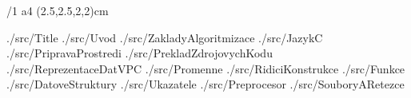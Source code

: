 

\cslang
\typosize[12/16]
\margins/1 a4 (2.5,2.5,2,2)cm


\def\rootpath{./src/}
\def\imgpath{./img/}


 {\rootpath Title}
 {\rootpath Uvod}
 {\rootpath ZakladyAlgoritmizace}
 {\rootpath JazykC}
 {\rootpath PripravaProstredi}
 {\rootpath PrekladZdrojovychKodu}
 {\rootpath ReprezentaceDatVPC}
 {\rootpath Promenne}
 {\rootpath RidiciKonstrukce}
 {\rootpath Funkce}
 {\rootpath DatoveStruktury}
 {\rootpath Ukazatele}
 {\rootpath Preprocesor}
 {\rootpath SouboryARetezce}

\bye


